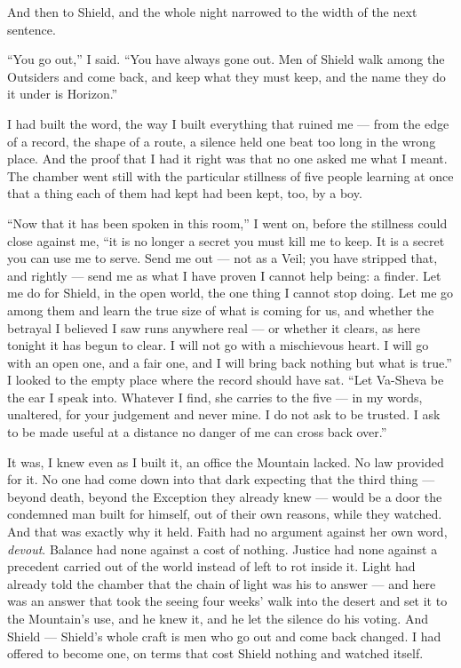 And then to Shield, and the whole night narrowed to the width of the next sentence.\par

``You go out,'' I said. ``You have always gone out. Men of Shield walk among the Outsiders and come back, and keep what they must keep, and the name they do it under is Horizon.''\par

I had built the word, the way I built everything that ruined me --- from the edge of a record, the shape of a route, a silence held one beat too long in the wrong place. And the proof that I had it right was that no one asked me what I meant. The chamber went still with the particular stillness of five people learning at once that a thing each of them had kept had been kept, too, by a boy.\par

``Now that it has been spoken in this room,'' I went on, before the stillness could close against me, ``it is no longer a secret you must kill me to keep. It is a secret you can use me to serve. Send me out --- not as a Veil; you have stripped that, and rightly --- send me as what I have proven I cannot help being: a finder. Let me do for Shield, in the open world, the one thing I cannot stop doing. Let me go among them and learn the true size of what is coming for us, and whether the betrayal I believed I saw runs anywhere real --- or whether it clears, as here tonight it has begun to clear. I will not go with a mischievous heart. I will go with an open one, and a fair one, and I will bring back nothing but what is true.'' I looked to the empty place where the record should have sat. ``Let Va-Sheva be the ear I speak into. Whatever I find, she carries to the five --- in my words, unaltered, for your judgement and never mine. I do not ask to be trusted. I ask to be made useful at a distance no danger of me can cross back over.''\par

It was, I knew even as I built it, an office the Mountain lacked. No law provided for it. No one had come down into that dark expecting that the third thing --- beyond death, beyond the Exception they already knew --- would be a door the condemned man built for himself, out of their own reasons, while they watched. And that was exactly why it held. Faith had no argument against her own word, \emph{devout}. Balance had none against a cost of nothing. Justice had none against a precedent carried out of the world instead of left to rot inside it. Light had already told the chamber that the chain of light was his to answer --- and here was an answer that took the seeing four weeks' walk into the desert and set it to the Mountain's use, and he knew it, and he let the silence do his voting. And Shield --- Shield's whole craft is men who go out and come back changed. I had offered to become one, on terms that cost Shield nothing and watched itself.\par

